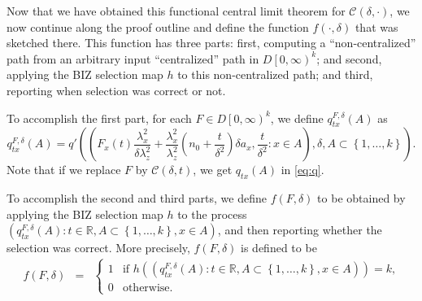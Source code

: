 \documentclass{wscpaperproc}
\theoremstyle{wsc}
\begin{document}
Now that we have obtained this functional central limit theorem for 
$\mathcal{C}\left(\delta,\cdot\right)$, we now continue along the proof outline and define the function $f(\cdot,\delta)$ that was sketched there.
This function has three parts: first, computing a ``non-centralized'' path from an arbitrary input ``centralized'' path in $D\left[0,\infty\right)^{k}$; and second, applying the BIZ selection map $h$ to this non-centralized path; and third, reporting when selection was correct or not.

To accomplish the first part, for each $F\in D\left[0,\infty\right)^{k}$, 
we define $q_{tx}^{F,\delta}\left(A\right)$ as
\[
q_{tx}^{F,\delta}\left(A\right)=q'\left(\left(F_{x}\left(t\right)\frac{\lambda_{x}^{2}}{\delta\lambda_{z}^{2}}+\frac{\lambda_{x}^{2}}{\lambda_{z}^{2}}\left(n_{0}+\frac{t}{\delta^{2}}\right)\delta a_{x},\frac{t}{\delta^{2}}:x\in A\right),\delta,A\subset\left\{ 1,\ldots,k\right\} \right).
\]
Note that if we replace $F$ by $\mathcal{C}\left(\delta,t\right)$,
we get $q_{tx}\left(A\right)$ in \eqref{eq:q}.   

To accomplish the second and third parts, we define
$f\left(F,\delta\right)$ to be obtained by applying the BIZ selection map $h$ to the process
$\left(q_{tx}^{F,\delta}\left(A\right):t\in\mathbb{R},A\subset\left\{ 1,\ldots,k\right\} ,x\in A\right)$, and then reporting whether the selection was correct.
More precisely, $f(F,\delta)$ is defined to be
\begin{eqnarray*}
f\left(F,\delta\right) & = & \begin{cases}
    1 & \text{if $h\left(\left(q_{tx}^{F,\delta}\left(A\right):t\in\mathbb{R},A\subset\left\{ 1,\ldots,k\right\} ,x\in A\right)\right) = k$,}\\
0 & \text{otherwise.}
\end{cases}
\end{eqnarray*}
\end{document}
